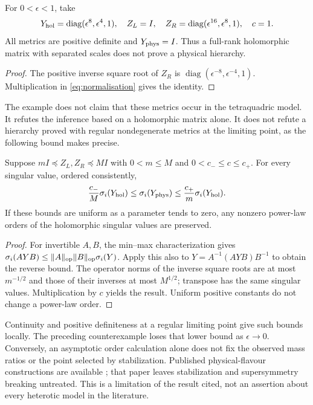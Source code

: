 \begin{proposition}\label{prop:normalisation}
For $0<\epsilon<1$, take
\[
Y_{\rm hol}=\operatorname{diag}(\epsilon^8,\epsilon^4,1),\quad
Z_L=I,\quad Z_R=\operatorname{diag}(\epsilon^{16},\epsilon^8,1),\quad c=1.
\]
All metrics are positive definite and $Y_{\rm phys}=I$. Thus a full-rank
holomorphic matrix with separated scales does not prove a physical hierarchy.
\end{proposition}
\begin{proof}
The positive inverse square root of $Z_R$ is
$\operatorname{diag}(\epsilon^{-8},\epsilon^{-4},1)$. Multiplication in
\eqref{eq:normalisation} gives the identity.
\end{proof}
The example does not claim that these metrics occur in the tetraquadric
model. It refutes the inference based on a holomorphic matrix alone.
It does not refute a hierarchy proved with regular nondegenerate metrics
at the limiting point, as the following bound makes precise.

\begin{proposition}\label{prop:bounded}
Suppose $mI\preceq Z_L,Z_R\preceq MI$ with $0<m\le M$ and
$0<c_-\le c\le c_+$. For every singular value, ordered consistently,
\[
 \frac{c_-}{M}\sigma_i(Y_{\rm hol})
 \le\sigma_i(Y_{\rm phys})
 \le\frac{c_+}{m}\sigma_i(Y_{\rm hol}).
\]
If these bounds are uniform as a parameter tends to zero, any nonzero
power-law orders of the holomorphic singular values are preserved.
\end{proposition}
\begin{proof}
For invertible $A,B$, the min--max characterization gives
$\sigma_i(AYB)\le\|A\|_{\rm op}\|B\|_{\rm op}\sigma_i(Y)$.
Apply this also to $Y=A^{-1}(AYB)B^{-1}$ to obtain the reverse bound.
The operator norms of the inverse square roots are at most $m^{-1/2}$
and those of their inverses at most $M^{1/2}$; transpose has the same
singular values. Multiplication by $c$ yields the result. Uniform positive
constants do not change a power-law order.
\end{proof}
Continuity and positive definiteness at a regular limiting point give
such bounds locally. The preceding counterexample loses that lower bound
as $\epsilon\to0$. Conversely, an asymptotic order calculation alone does
not fix the observed mass ratios or the point selected by stabilization.
Published physical-flavour constructions are available \cite{CLLN};
that paper leaves stabilization and supersymmetry breaking untreated.
This is a limitation of the result cited, not an assertion about every
heterotic model in the literature.

